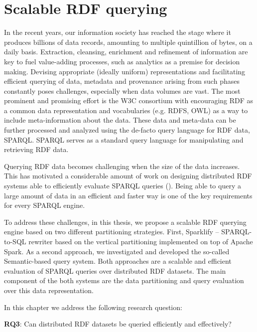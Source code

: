 \chapter{Scalable RDF querying}
\label{chapter:scalable_rdf_querying}
In the recent years, our information society has reached the stage where it produces billions of data records, amounting to multiple quintillion of bytes, on a daily basis.
Extraction, cleansing, enrichment and refinement of information are key to fuel value-adding processes, such as analytics as a premise for decision making.
Devising appropriate (ideally uniform) representations and facilitating efficient querying of data, metadata and provenance arising from such phases constantly poses challenges, especially when data volumes are vast.
The most prominent and promising effort is the \gls{W3C} consortium with encouraging \gls{RDF} as a common data representation and vocabularies (e.g. RDFS, \gls{OWL}) as a way to include meta-information about the data.
These data and meta-data can be further processed and analyzed using the de-facto query language for \gls{RDF} data, \gls{SPARQL}.
\gls{SPARQL} serves as a standard query language for manipulating and retrieving \gls{RDF} data.

Querying \gls{RDF} data becomes challenging when the size of the data increases. 
This has motivated a considerable amount of work on designing distributed \gls{RDF} systems able to efficiently evaluate \gls{SPARQL} queries (\cite{Schatzle:2016:SRQ:2977797.2977806,sparqlgx-iswc-2016}).
Being able to query a large amount of data in an efficient and faster way is one of the key requirements for every \gls{SPARQL} engine.

To address these challenges, in this thesis, we propose a scalable \gls{RDF} querying engine based on two different partitioning strategies.
First, Sparklify -- SPARQL-to-SQL rewriter based on the vertical partitioning implemented on top of Apache Spark.
As a second approach, we investigated and developed the so-called Semantic-based query system. 
Both approaches are a scalable and efficient evaluation of \gls{SPARQL} queries over distributed \gls{RDF} datasets. 
The main component of the both systems are the data partitioning and query evaluation over this data representation.

In this chapter we address the following research question:
\begin{tcolorbox}
\textbf{RQ3}: Can distributed \gls{RDF} datasets be queried efficiently and effectively?
\end{tcolorbox}

